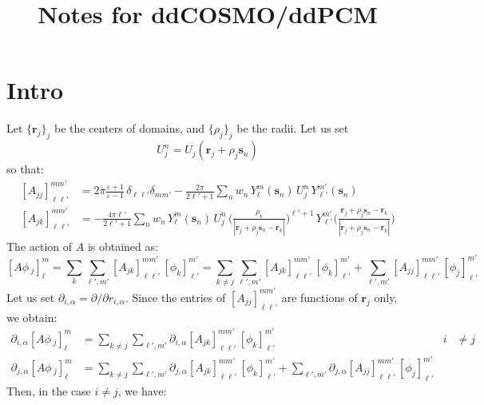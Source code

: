 \documentclass[12pt,letterpaper,oneside]{article}
\title{Notes for ddCOSMO/ddPCM}
\theoremstyle{definition}
\begin{document}
\maketitle

\section{Intro}
Let $\{\boldsymbol{r}_j \}_j$ be the centers of domains, and $\{ \rho_j\}_j$ be the radii. Let us set
\[
U_j^n = U_j(\boldsymbol{r}_j + \rho_j\boldsymbol{s}_n)
\]
so that:
\begin{align*}
{[A_{jj}]}_{\ell \ell'}^{mm'}& = 2\pi \frac{\varepsilon + 1}{\varepsilon - 1}\, \delta_{\ell \ell'} \delta_{m m'} - \frac{2\pi}{2 \ell' + 1} \sum_n w_n \,Y_\ell^m(\boldsymbol{s}_n) \, U_j^n \, Y_{\ell'}^{m'}(\boldsymbol{s}_n) \\
{[A_{jk}]}_{\ell \ell'}^{mm'}& = -  \frac{4 \pi \ell'}{2 \ell'+1} \sum_n w_n \, Y_\ell^m(\boldsymbol{s}_n) \, U_j^n \, \bigg( \frac{\rho_k}{|\boldsymbol{r}_j + \rho_j \boldsymbol{s}_n - \boldsymbol{r}_k|} \bigg)^{\ell'+1} \, Y_{\ell'}^{m'} \bigg( \frac{\boldsymbol{r}_j + \rho_j \boldsymbol{s}_n - \boldsymbol{r}_k}{|\boldsymbol{r}_j + \rho_j \boldsymbol{s}_n - \boldsymbol{r}_k|} \bigg)
\end{align*}
The action of $A$ is obtained as:
\[
[A \phi \,_j]_\ell^m = \sum_k \sum_{\ell',m'} [A_{jk}]_{\ell \ell'}^{m m'} \, [\phi_k]_{\ell'}^{m'} = \sum_{k\ne j} \sum_{\ell',m'} [A_{jk}]_{\ell \ell'}^{m m'} \, [\phi_k]_{\ell'}^{m'} + \sum_{\ell',m'} [A_{jj}]_{\ell \ell'}^{m m'} \, [\phi_j]_{\ell'}^{m'}
\]
Let us set $\partial_{i,\alpha} = \partial/\partial r_{i,\alpha}$. Since the entries of ${[A_{jj}]}_{\ell \ell'}^{mm'}$ are functions of $\boldsymbol{r}_j$ only, we obtain:
\begin{align*}
\partial_{i,\alpha} [A \phi \,_j]_\ell^m & = \sum_{k\ne j} \sum_{\ell',m'} \partial_{i,\alpha}[A_{jk}]_{\ell \ell'}^{m m'} \, [\phi_k]_{\ell'}^{m'}  & i  &\ne j \\
\partial_{j,\alpha} [A \phi \,_j]_\ell^m & = \sum_{k\ne j} \sum_{\ell',m'} \partial_{j,\alpha}[A_{jk}]_{\ell \ell'}^{m m'} \, [\phi_k]_{\ell'}^{m'} + \sum_{\ell',m'} \partial_{j,\alpha} [A_{jj}]_{\ell \ell'}^{m m'} \, [\phi_j]_{\ell'}^{m'} & &
\end{align*}
Then, in the case $i\ne j$, we have:
\end{document}
